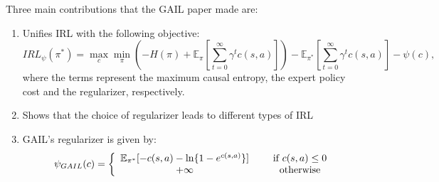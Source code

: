\documentclass[11pt]{article}
\begin{document}
Three main contributions that the GAIL paper made are:
\begin{enumerate}
    \item Unifies IRL with the following objective:
    \begin{equation}
        IRL_\psi(\pi^\ast) = \max\limits_c \min\limits_\pi (-H(\pi) 
        + \mathbb{E}_\pi [\sum\limits_{t=0}^\infty \gamma^t c(s, a)]) 
        - \mathbb{E}_{\pi^\ast}[\sum\limits_{t=0}^\infty \gamma^t c(s, a)] - \psi(c),
    \end{equation}
    where the terms represent the maximum causal entropy, the expert policy cost and the regularizer, respectively. 
    \item Shows that the choice of regularizer leads to different types of IRL
    \item GAIL's regularizer is given by:
    \begin{align}
    \psi_{GAIL}(c) = \left\{ \begin{array}{cc} 
               \mathbb{E}_{\pi^\ast}[-c(s, a) - \ln\{ 1 - e^{c(s, a)}\}] & \hspace{5mm} \text{if } c(s, a)\leq 0 \\
                +\infty & \hspace{5mm} \text{ otherwise }
                \end{array} \right.
    \end{align}
\end{enumerate}

{


}



\end{document}
